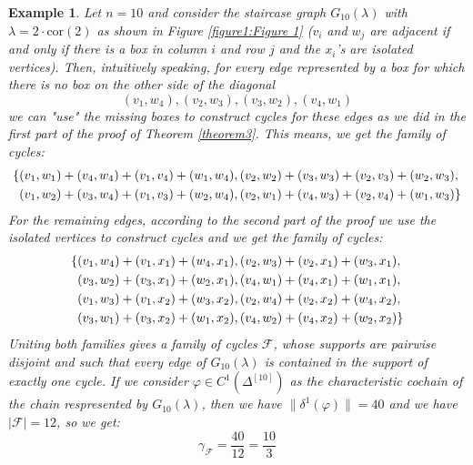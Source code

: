 \documentclass{article}
\newtheorem{expl}{Example}[section]
\begin{document}
\begin{expl}
Let $n=10$ and consider the staircase graph $G_{10}(\lambda)$ with $\lambda=2\cdot\text{cor}(2)$ as shown in Figure \ref{figure1:Figure 1} ($v_i$ and $w_j$ are adjacent if and only if there is a box in column $i$ and row $j$ and the $x_i$'s are isolated vertices). Then, intuitively speaking, for every edge represented by a box for which there is no box on the other side of the diagonal
\[
(v_1,w_4),(v_2,w_3),(v_3,w_2),(v_4,w_1)
\]
we can "use" the missing boxes to construct cycles for these edges as we did in the first part of the proof of Theorem \ref{theorem3}. This means, we get the family of cycles:
\begin{align}
\{&(v_1,w_1)+(v_4,w_4)+(v_1,v_4)+(w_1,w_4),(v_2,w_2)+(v_3,w_3)+(v_2,v_3)+(w_2,w_3),\notag\\
&(v_1,w_2)+(v_3,w_4)+(v_1,v_3)+(w_2,w_4),(v_2,w_1)+(v_4,w_3)+(v_2,v_4)+(w_1,w_3)\}\notag
\end{align}
For the remaining edges, according to the second part of the proof we use the isolated vertices to construct cycles and we get the family of cycles:
\begin{align}
\{&(v_1,w_4)+(v_1,x_1)+(w_4,x_1),(v_2,w_3)+(v_2,x_1)+(w_3,x_1),\notag\\
&(v_3,w_2)+(v_3,x_1)+(w_2,x_1),(v_4,w_1)+(v_4,x_1)+(w_1,x_1),\notag\\
&(v_1,w_3)+(v_1,x_2)+(w_3,x_2),(v_2,w_4)+(v_2,x_2)+(w_4,x_2),\notag\\
&(v_3,w_1)+(v_3,x_2)+(w_1,x_2),(v_4,w_2)+(v_4,x_2)+(w_2,x_2)\}\notag
\end{align}
Uniting both families gives a family of cycles $\mathcal{F}$, whose supports are pairwise disjoint and such that every edge of $G_{10}(\lambda)$ is contained in the support of exactly one cycle. If we consider $\varphi\in C^1(\Delta^{[10]})$ as the characteristic cochain of the chain respresented by $G_{10}(\lambda)$, then we have $\|\delta^1(\varphi)\|=40$ and we have $|\mathcal{F}|=12$, so we get:
\[
\gamma_{\mathcal{F}}=\frac{40}{12}=\frac{10}{3}
\]

\begin{figure}[ht]
\centering
{}
\end{figure}
\end{expl}
\end{document}
